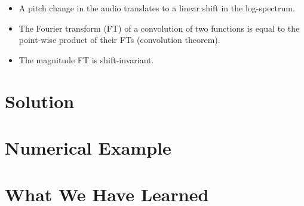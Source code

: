 \documentclass[journal]{IEEEtran}
\begin{document}
\begin{itemize}
\item A pitch change in the audio translates to a linear shift in the log-spectrum.
\item The Fourier transform (FT) of a convolution of two functions is equal to the point-wise product of their FTs (convolution theorem).
\item The magnitude FT is shift-invariant.
\end{itemize}


%


\section{Solution}




\section{Numerical Example}




\section{What We Have Learned}
\end{document}
